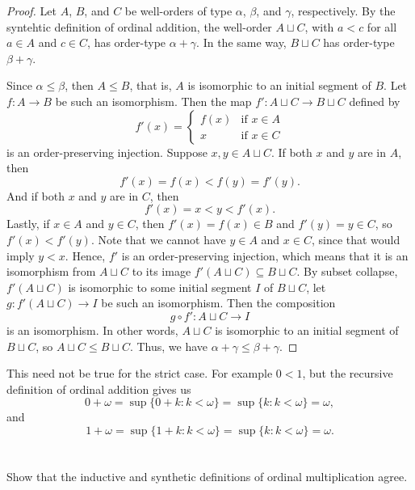 \documentclass[12pt]{article}
\newenvironment{pbox}
    {\begin{lrbox}{\mybox}\begin{minipage}{0.98\textwidth}}
    {\end{minipage}\end{lrbox}\begin{center}\framebox[\textwidth]{\usebox{\mybox}}\end{center}}
\theoremstyle{definition}
\begin{document}
\begin{proof}
    Let $A$, $B$, and $C$ be well-orders of type $\alpha$, $\beta$, and $\gamma$, respectively. By the syntehtic definition of ordinal addition, the well-order $A \sqcup C$, with $a < c$ for all $a \in A$ and $c \in C$, has order-type $\alpha + \gamma$. In the same way, $B \sqcup C$ has order-type $\beta + \gamma$.
    
    Since $\alpha \leq \beta$, then $A \leq B$, that is, $A$ is isomorphic to an initial segment of $B$. Let $f: A \to B$ be such an isomorphism. Then the map $f' : A \sqcup C \to B \sqcup C$ defined by
    \[
        f'(x) = \begin{cases}
            f(x) &\text{if $x \in A$} \\
            x &\text{if $x \in C$}
        \end{cases}
    \]
    is an order-preserving injection. Suppose $x, y \in A \sqcup C$. If both $x$ and $y$ are in $A$, then
    \[
        f'(x) = f(x) < f(y) = f'(y).
    \]
    And if both $x$ and $y$ are in $C$, then
    \[
        f'(x) = x < y < f'(x).
    \]
    Lastly, if $x \in A$ and $y \in C$, then $f'(x) = f(x) \in B$ and $f'(y) = y \in C$, so $f'(x) < f'(y)$. Note that we cannot have $y \in A$ and $x \in C$, since that would imply $y < x$. Hence, $f'$ is an order-preserving injection, which means that it is an isomorphism from $A \sqcup C$ to its image $f'(A\sqcup C) \subseteq B \sqcup C$. By subset collapse, $f'(A\sqcup C)$ is isomorphic to some initial segment $I$ of $B \sqcup C$, let $g : f'(A \sqcup C) \to I$ be such an isomorphism. Then the composition
    \[
        g \circ f' : A \sqcup C \to I
    \]
    is an isomorphism. In other words, $A \sqcup C$ is isomorphic to an initial segment of $B \sqcup C$, so $A \sqcup C \leq B \sqcup C$. Thus, we have $\alpha + \gamma \leq \beta + \gamma$.
    
\end{proof}

This need not be true for the strict case. For example $0 < 1$, but the recursive definition of ordinal addition gives us
\[
    0 + \omega = \sup\{0 + k : k < \omega\} = \sup\{k : k < \omega\} = \omega,
\]
and
\[
    1 + \omega = \sup\{1 + k : k < \omega\} = \sup\{k : k < \omega\} = \omega.
\]

\newpage
\section{}
\begin{pbox}
    Show that the inductive and synthetic definitions of ordinal multiplication agree.
\end{pbox}
\end{document}
